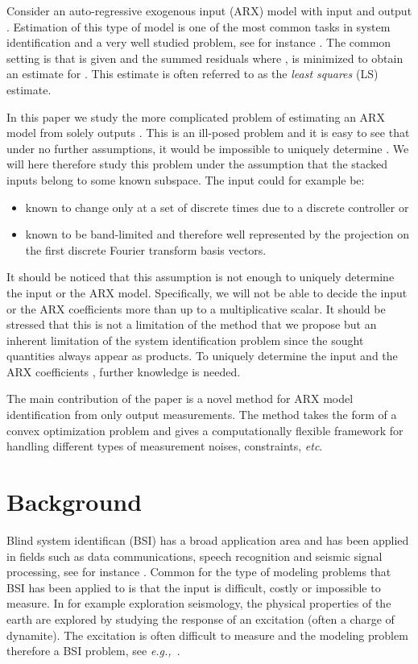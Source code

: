 \documentclass{ifacconf}
\newcommand{\0}{{\bf 0}}
\newcommand{\eg}{\textit{e.g.,~}}
\begin{document}
Consider an auto-regressive exogenous input (ARX) model   
 with input  and output .
Estimation of this type of model is one of  the most common tasks in
system identification and a very well studied problem, see for instance \citet{Ljung:99}. 
The common
setting is that   is given and the summed
residuals{\small
}where , is minimized to obtain an estimate for . This estimate is often
referred to as the \textit{least squares} (LS) estimate.


In this paper we study the more complicated problem of
estimating an ARX model from solely outputs . This is
an ill-posed problem and it is easy to see that under no further
assumptions, it would be impossible to uniquely determine
. We will here therefore study this problem under the assumption
that the stacked inputs belong to some known subspace. The input
could for example be:
\begin{itemize}
\item known to change only at a set of discrete times
due to a discrete controller or  
\item known to be band-limited and therefore well represented by the projection
  on the first discrete Fourier transform basis vectors.  
\end{itemize}
It should be noticed that this assumption 
is not enough to uniquely determine the input or the ARX
model. Specifically, we will not be able to decide the input or the
ARX coefficients   more than up to a
multiplicative scalar. It should be stressed that this is not a
limitation of the method that we propose but an inherent
limitation of the system identification problem since the sought quantities
always appear as products. To uniquely determine the input and the
ARX coefficients , further knowledge is needed.  



The main contribution of the paper is a novel method for ARX model
identification from only output measurements. The method takes the
form of a convex optimization problem and gives a computationally  flexible framework
for handling different types of measurement noises, constraints, \textit{etc}.  




\section{Background}
\label{sec:background}

Blind system identifican (BSI) has a broad application area and has
been applied in fields such as  data communications, speech
recognition and seismic signal processing, see for instance
\cite{Abed97}. Common for the type of modeling problems  that BSI has been
applied to is that the input is difficult, costly or impossible to
measure. In for example  exploration seismology, the physical
properties of the earth are explored by studying the response of
 an excitation (often a charge of dynamite). The excitation is often
 difficult to measure and the modeling problem therefore a BSI problem, see \eg \cite{Zerva199947}.
\end{document}
